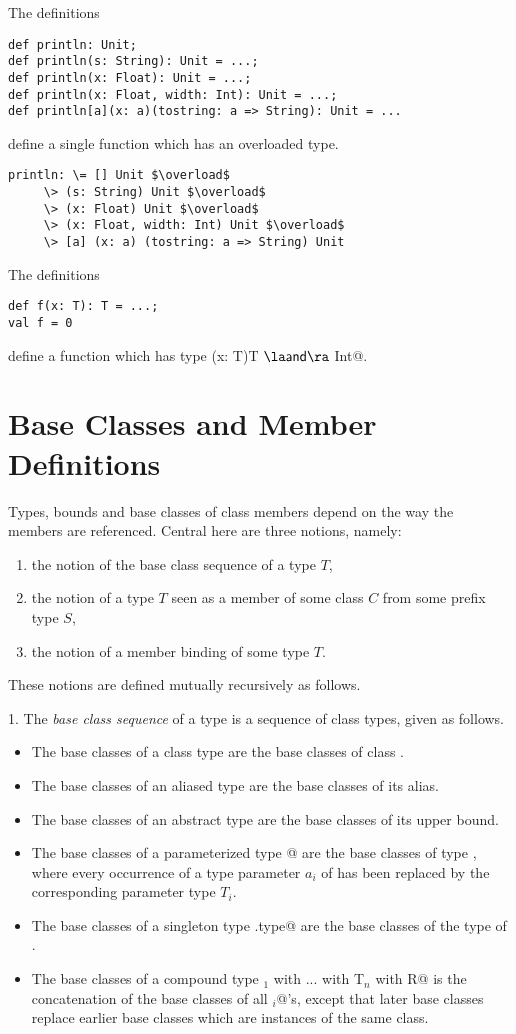 \documentclass[11pt]{report}
\begin{document}
\example The definitions
\begin{verbatim}
def println: Unit;
def println(s: String): Unit = ...;
def println(x: Float): Unit = ...;
def println(x: Float, width: Int): Unit = ...;
def println[a](x: a)(tostring: a => String): Unit = ...
\end{verbatim}
define a single function \verb@println@ which has an overloaded
type.
\begin{verbatim}
println: \= [] Unit $\overload$
	 \> (s: String) Unit $\overload$
	 \> (x: Float) Unit $\overload$
	 \> (x: Float, width: Int) Unit $\overload$
	 \> [a] (x: a) (tostring: a => String) Unit
\end{verbatim}

\example The definitions
\begin{verbatim}
def f(x: T): T = ...;
val f = 0
\end{verbatim}
define a function \verb@f@ which has type \verb@(x: T)T $\overload$ Int@.

\section{Base Classes and Member Definitions}
\label{sec:base-classes}

Types, bounds and base classes of class members depend on the way the
members are referenced.  Central here are three notions, namely:
\begin{enumerate}
\item the notion of the base class sequence of a type $T$,
\item the notion of a type $T$ seen as a member of some class $C$ from some 
      prefix type $S$,
\item the notion of a member binding of some type $T$.
\end{enumerate}
These notions are defined mutually recursively as follows.

1. The {\em base class sequence} of a type is a sequence of class types, 
given as follows.
\begin{itemize}
\item
The base classes of a class type \verb@C@ are the base classes of class
\verb@C@.
\item
The base classes of an aliased type are the base classes of its alias.
\item
The base classes of an abstract type are the base classes of its upper bound.
\item
The base classes of a parameterized type \verb@C[T$_1$, ..., T$_n$]@ are the base classes
of type \verb@C@, where every occurrence of a type parameter $a_i$ 
of \verb@C@ has been replaced by the corresponding parameter type $T_i$.
\item
The base classes of a singleton type \verb@p.type@ are the base classes of
the type of \verb@p@.
\item
The base classes of a compound type
\verb@T$_1$ with ... with T$_n$ with {R}@ is the concatenation of the
base classes of all \verb@T$_i$@'s, except that later base classes replace
earlier base classes which are instances of the same class.
\end{itemize}
\end{document}
